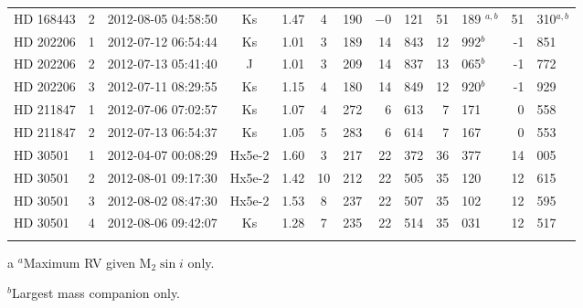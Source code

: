 \begin{table*}
\begin{tabular}{l c c c c c c r@{.}l r@{.}l r@{.}l}
                {HD 168443} & 2 & 2012-08-05 04:58:50 & Ks     		& 1.47 		& 4 & 190 & $-$0   & 121 & 51 & 189 $^{a, b}$ & 51&310$^{a, b}$ \\ %
                {HD 202206} & 1 & 2012-07-12 06:54:44 & Ks     		& 1.01 		& 3& 189 & 14      & 843 & 12 & 992$^b$  & -1&851 \\ %
                {HD 202206} & 2 & 2012-07-13 05:41:40 & J       	  & 1.01 	  & 3 & 209 & 14      & 837 & 13 & 065$^b$  & -1&772 \\ %
                {HD 202206} & 3 & 2012-07-11 08:29:55 & Ks     		& 1.15		& 4& 180 & 14      & 849 & 12 & 920$^b$  & -1&929 \\ %
                {HD 211847} & 1 & 2012-07-06 07:02:57 & Ks     		& 1.07 		& 4& 272 & 6        & 613 & 7   & 171 & 0& 558\\ %
                {HD 211847} & 2 & 2012-07-13 06:54:37 & Ks     		& 1.05 		& 5& 283 & 6        & 614 & 7   & 167 & 0&553 \\ %
                {HD 30501}  & 1 & 2012-04-07 00:08:29 & Hx5e-2 	 & 1.60 	 & 3& 217 & 22      &  372 & 36 & 377 & 14&005 \\ %
                {HD 30501}  & 2 & 2012-08-01 09:17:30 & Hx5e-2    & 1.42     & 10& 212 & 22      & 505 & 35  & 120 & 12&615 \\ %
                {HD 30501}  & 3 & 2012-08-02 08:47:30 & Hx5e-2 	 & 1.53 	 & 8& 237 & 22      & 507 &  35 & 102 & 12&595 \\ %
                {HD 30501}  & 4 & 2012-08-06 09:42:07 & Ks     		 & 1.28 	 & 7& 235& 22      & 514 & 35 & 031 & 12&517 \\ %
                \bottomrule
                & & & & 
        \end{tabular}
        \begin{tablenotes}
          \item  [a] {$^a$}{Maximum RV given \(\textrm{M}_2\sin{i}\) only.}
          \item  {$^b$}{Largest mass companion only.}
        \end{tablenotes}
    \label{tab:observations}
\end{table*}